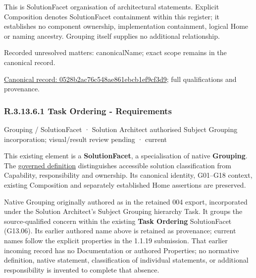 This is SolutionFacet organisation of architectural statements. Explicit Composition denotes SolutionFacet containment within this register; it establishes no component ownership, implementation containment, logical Home or naming ancestry. Grouping itself supplies no additional relationship.


{\small Recorded unresolved matters: canonicalName; exact scope remains in the canonical record.}\par
{\footnotesize \href{../../../../../../../continuum/grouping/0528b2ac76c548ae861ebcb1ef9cf3d9.md}{Canonical record: 0528b2ac76c548ae861ebcb1ef9cf3d9}; full qualifications and provenance.}\par
\subsubsection*{R.3.13.6.1 Task Ordering - Requirements}
\label{navigation:R.3.13.6.1}

\label{element:5e7bdebc353e49259113adf2a5b93aad}
{\small Grouping / SolutionFacet · Solution Architect authorised Subject Grouping incorporation; visual/result review pending · current}\par

This existing element is a \textbf{SolutionFacet}, a specialisation of native
\textbf{Grouping}. The \href{\detokenize{../../../../../../../governance/continuum-representation.md#solutionfacet-classification--1119-candidate}}{governed definition}
distinguishes accessible solution classification from Capability, responsibility
and ownership. Its canonical identity, G01–G18 context, existing Composition
and separately established Home assertions are preserved.



Native Grouping originally authored as \texttt{} in the retained 004 export,
incorporated under the Solution Architect's Subject Grouping hierarchy Task.
It groups the source-qualified \texttt{} concern within
the existing \textbf{Task Ordering} SolutionFacet (G13.06). Its earlier authored name above is retained as provenance; current names
follow the explicit properties in the 1.1.19 submission.
That earlier incoming record has no Documentation or authored Properties; no normative
definition, native statement, classification of individual statements, or
additional responsibility is invented to complete that absence.



